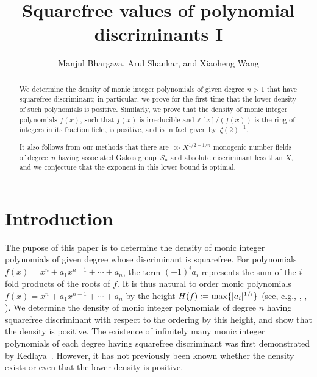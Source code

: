 \documentclass[11pt]{article}
\title{Squarefree values of polynomial discriminants I}
\author{Manjul Bhargava, Arul Shankar, and Xiaoheng Wang}
\def\Z{{\mathbb Z}}
\def\Z{{\mathbb Z}}
\def\max{{\rm max}}
\begin{document}
\maketitle

\begin{abstract}
We determine the density of monic integer polynomials of given degree
$n>1$ that have squarefree discriminant; in particular, we prove for the
first time that the lower density of such polynomials is positive.
Similarly, we prove that the density of monic integer polynomials
$f(x)$, such that $f(x)$ is irreducible and $\Z[x]/(f(x))$ is the ring
of integers in its fraction field, is positive, and is in fact given
by~$\zeta(2)^{-1}$.

It also follows from our methods that there are $\gg X^{1/2+1/n}$
monogenic number fields of degree~$n$ having associated Galois
group~$S_n$ and absolute discriminant less than $X$, and we conjecture
that the exponent in this lower bound is optimal.
\end{abstract}

\section{Introduction}

The pupose of this paper is to determine the density of monic integer
polynomials of given degree whose discriminant is squarefree.  For
polynomials $f(x)=x^n+a_1x^{n-1}+\cdots+a_n$, the term $(-1)^ia_i$
represents the sum of the $i$-fold products of the roots of $f$. It is
thus natural to order monic polynomials
$f(x)=x^n+a_1x^{n-1}+\cdots+a_n$ by the height
$H(f):=\max\{|a_i|^{1/i}\}$ (see, e.g., \cite{BG2}, \cite{PS2},
\cite{SW}).  We determine the density of monic integer polynomials
of degree $n$ having squarefree discriminant with respect to the ordering by this
height, and show that the density is positive.  The existence of infinitely many monic integer
polynomials of each degree having squarefree discriminant was
first demonstrated by Kedlaya~\cite{Kedlaya}.
However, it has not previously been known whether the density exists or even that the lower density
is positive.
\end{document}
